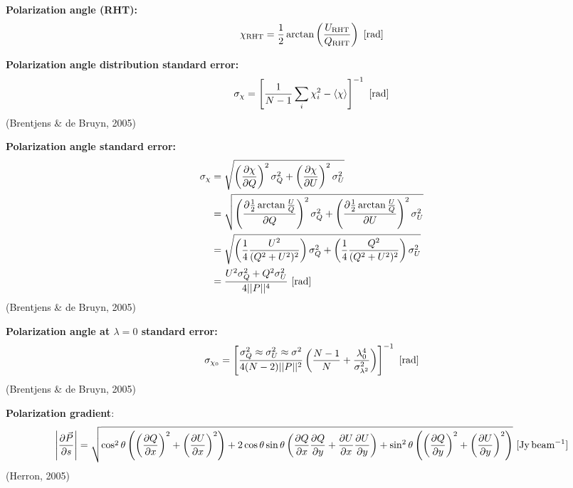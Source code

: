 \documentclass[a4paper,10pt]{article}
\begin{document}
{\noindent}\textbf{Polarization angle (RHT):}
\begin{align*}
\chi_\mathrm{RHT} = \dfrac{1}{2}\arctan\left(\dfrac{U_\mathrm{RHT}}{Q_\mathrm{RHT}}\right) ~ [{\rm rad}]
\end{align*}

{\noindent}\textbf{Polarization angle distribution standard error:} 
\begin{align*}
\sigma_\chi = \left[ \dfrac{1}{N-1} \sum_i\chi_i^2 - \langle\chi\rangle \right]^{-1} ~ [{\rm rad}]
\end{align*}
(Brentjens \& de Bruyn, 2005)

{\noindent}\textbf{Polarization angle standard error:}
\begin{align*}
\sigma_\chi &= \sqrt{ \left(\dfrac{\partial\chi}{\partial Q}\right)^2\sigma_Q^2 + \left(\dfrac{\partial\chi}{\partial U}\right)^2\sigma_U^2 }\\
&= \sqrt{ \left(\dfrac{\partial\frac{1}{2}\arctan\frac{U}{Q}}{\partial Q}\right)^2\sigma_Q^2 + \left(\dfrac{\partial\frac{1}{2}\arctan\frac{U}{Q}}{\partial U}\right)^2\sigma_U^2 } \\
&= \sqrt{ \left(\dfrac{1}{4}\dfrac{U^2}{(Q^2+U^2)^2}\right)\sigma_Q^2 + \left(\dfrac{1}{4}\dfrac{Q^2}{(Q^2+U^2)^2}\right)\sigma_U^2 } \\
&= \dfrac{U^2\sigma_Q^2 + Q^2\sigma_U^2}{4\lvert\lvert P \rvert\rvert^4} ~ [{\rm rad}]
\end{align*}
(Brentjens \& de Bruyn, 2005)

{\noindent}\textbf{Polarization angle at $\lambda=0$ standard error:} 
\begin{align*}
\sigma_{\chi_0} = \left[ \dfrac{\sigma_Q^2\approx\sigma_U^2\approx\sigma^2}{4(N-2)\lvert\lvert P \rvert\rvert^2} \left( \dfrac{N-1}{N} + \dfrac{\lambda_0^4}{\sigma_{\lambda^2}^2} \right) \right]^{-1} ~ [{\rm rad}]
\end{align*}
(Brentjens \& de Bruyn, 2005)

{\noindent}\textbf{Polarization gradient}:
\begin{align*}
	\left\lvert\dfrac{\partial\vec{P}}{\partial s}\right\rvert = \sqrt{ \cos^2\theta\left(\left(\frac{\partial Q}{\partial x}\right)^2+\left(\frac{\partial U}{\partial x}\right)^2\right) + 2\cos\theta\sin\theta\left(\frac{\partial Q}{\partial x}\frac{\partial Q}{\partial y} + \frac{\partial U}{\partial x}\frac{\partial U}{\partial y}\right) + \sin^2\theta\left(\left(\frac{\partial Q}{\partial y}\right)^2 + \left(\frac{\partial U}{\partial y}\right)^2\right) } ~ [\rm Jy\,beam^{-1}]
\end{align*}
(Herron, 2005)
\end{document}
